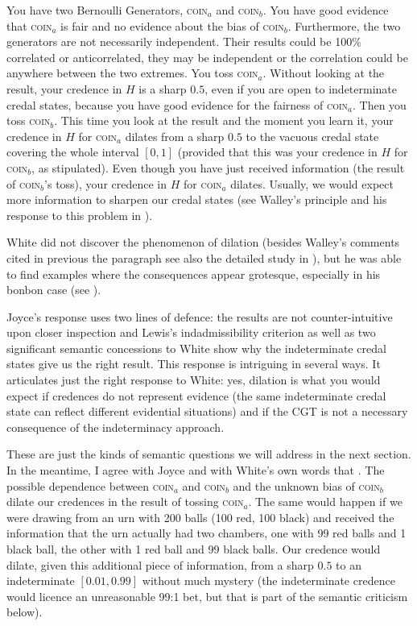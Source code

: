 You have two Bernoulli Generators, \textsc{coin}$_{a}$
and \textsc{coin}$_{b}$. You have good evidence that
\textsc{coin}$_{a}$ is fair and no evidence about the
bias of \textsc{coin}$_{b}$. Furthermore, the two
generators are not necessarily independent. Their
results could be 100\% correlated or anticorrelated,
they may be independent or the correlation could be
anywhere between the two extremes. You toss
\textsc{coin}$_{a}$. Without looking at the result,
your credence in $H$ is a sharp $0.5$, even if you are
open to indeterminate credal states, because you have
good evidence for the fairness of \textsc{coin}$_{a}$.
Then you toss \textsc{coin}$_{b}$. This time you look
at the result and the moment you learn it, your
credence in $H$ for \textsc{coin}$_{a}$ dilates from a
sharp $0.5$ to the vacuous credal state covering the
whole interval $[0,1]$ (provided that this was your
credence in $H$ for \textsc{coin}$_{b}$, as
stipulated). Even though you have just received
information (the result of \textsc{coin}$_{b}$'s toss),
your credence in $H$ for \textsc{coin}$_{a}$ dilates.
Usually, we would expect more information to sharpen
our credal states (see Walley's  principle and his
response to this problem in ).

White did not discover the phenomenon of dilation
(besides Walley's comments cited in previous the
paragraph see also the detailed study in
), but he was able to
find examples where the consequences appear grotesque,
especially in his bonbon case (see
).

Joyce's response uses two lines of defence: the results
are not counter-intuitive upon closer inspection and
Lewis's indadmissibility criterion as well as two
significant semantic concessions to White show why the
indeterminate credal states give us the right result.
This response is intriguing in several ways. It
articulates just the right response to White: yes,
dilation is what you would expect if credences do not
represent evidence (the same indeterminate credal state
can reflect different evidential situations) and if the
CGT is not a necessary consequence of the indeterminacy
approach.

These are just the kinds of semantic questions we will
address in the next section. In the meantime, I agree
with Joyce and with White's own words that 
. The possible dependence
between \textsc{coin}$_{a}$ and \textsc{coin}$_{b}$ and
the unknown bias of \textsc{coin}$_{b}$ dilate our
credences in the result of tossing \textsc{coin}$_{a}$.
The same would happen if we were drawing from an urn
with 200 balls (100 red, 100 black) and received the
information that the urn actually had two chambers, one
with 99 red balls and 1 black ball, the other with 1
red ball and 99 black balls. Our credence would dilate,
given this additional piece of information, from a
sharp $0.5$ to an indeterminate $[0.01,0.99]$ without
much mystery (the indeterminate credence would licence
an unreasonable 99:1 bet, but that is part of the
semantic criticism below).

